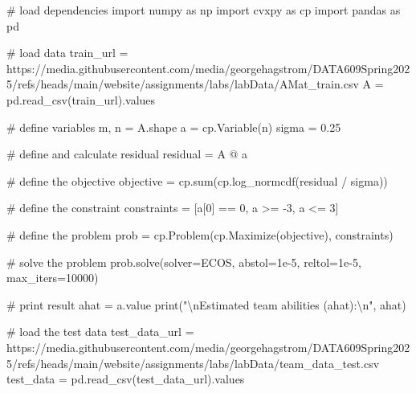 \documentclass[
  letterpaper,
  DIV=11,
  numbers=noendperiod]{scrartcl}
\newenvironment{Shaded}{\begin{snugshade}}{\end{snugshade}}
\newcommand{\BuiltInTok}[1]{\textcolor[rgb]{0.00,0.23,0.31}{#1}}
\newcommand{\CharTok}[1]{\textcolor[rgb]{0.13,0.47,0.30}{#1}}
\newcommand{\CommentTok}[1]{\textcolor[rgb]{0.37,0.37,0.37}{#1}}
\newcommand{\DecValTok}[1]{\textcolor[rgb]{0.68,0.00,0.00}{#1}}
\newcommand{\FloatTok}[1]{\textcolor[rgb]{0.68,0.00,0.00}{#1}}
\newcommand{\ImportTok}[1]{\textcolor[rgb]{0.00,0.46,0.62}{#1}}
\newcommand{\NormalTok}[1]{\textcolor[rgb]{0.00,0.23,0.31}{#1}}
\newcommand{\OperatorTok}[1]{\textcolor[rgb]{0.37,0.37,0.37}{#1}}
\newcommand{\StringTok}[1]{\textcolor[rgb]{0.13,0.47,0.30}{#1}}
\begin{document}
\begin{Shaded}
\begin{Highlighting}[]
\CommentTok{\# load dependencies}
\ImportTok{import}\NormalTok{ numpy }\ImportTok{as}\NormalTok{ np}
\ImportTok{import}\NormalTok{ cvxpy }\ImportTok{as}\NormalTok{ cp}
\ImportTok{import}\NormalTok{ pandas }\ImportTok{as}\NormalTok{ pd}

\CommentTok{\# load data}
\NormalTok{train\_url }\OperatorTok{=} \StringTok{\textquotesingle{}https://media.githubusercontent.com/media/georgehagstrom/DATA609Spring2025/refs/heads/main/website/assignments/labs/labData/AMat\_train.csv\textquotesingle{}}
\NormalTok{A }\OperatorTok{=}\NormalTok{ pd.read\_csv(train\_url).values}

\CommentTok{\# define variables}
\NormalTok{m, n }\OperatorTok{=}\NormalTok{ A.shape}
\NormalTok{a }\OperatorTok{=}\NormalTok{ cp.Variable(n)}
\NormalTok{sigma }\OperatorTok{=} \FloatTok{0.25}

\CommentTok{\# define and calculate residual}
\NormalTok{residual }\OperatorTok{=}\NormalTok{ A }\OperatorTok{@}\NormalTok{ a}

\CommentTok{\# define the objective}
\NormalTok{objective }\OperatorTok{=}\NormalTok{ cp.}\BuiltInTok{sum}\NormalTok{(cp.log\_normcdf(residual }\OperatorTok{/}\NormalTok{ sigma))}

\CommentTok{\# define the constraint}
\NormalTok{constraints }\OperatorTok{=}\NormalTok{ [a[}\DecValTok{0}\NormalTok{] }\OperatorTok{==} \DecValTok{0}\NormalTok{, a }\OperatorTok{\textgreater{}=} \OperatorTok{{-}}\DecValTok{3}\NormalTok{, a }\OperatorTok{\textless{}=} \DecValTok{3}\NormalTok{]}

\CommentTok{\# define the problem}
\NormalTok{prob }\OperatorTok{=}\NormalTok{ cp.Problem(cp.Maximize(objective), constraints)}

\CommentTok{\# solve the problem}
\NormalTok{prob.solve(solver}\OperatorTok{=}\StringTok{\textquotesingle{}ECOS\textquotesingle{}}\NormalTok{, abstol}\OperatorTok{=}\FloatTok{1e{-}5}\NormalTok{, reltol}\OperatorTok{=}\FloatTok{1e{-}5}\NormalTok{, max\_iters}\OperatorTok{=}\DecValTok{10000}\NormalTok{)}

\CommentTok{\# print result}
\NormalTok{ahat }\OperatorTok{=}\NormalTok{ a.value}
\BuiltInTok{print}\NormalTok{(}\StringTok{"}\CharTok{\textbackslash{}n}\StringTok{Estimated team abilities (ahat):}\CharTok{\textbackslash{}n}\StringTok{"}\NormalTok{, ahat)}

\CommentTok{\# load the test data}
\NormalTok{test\_data\_url }\OperatorTok{=} \StringTok{\textquotesingle{}https://media.githubusercontent.com/media/georgehagstrom/DATA609Spring2025/refs/heads/main/website/assignments/labs/labData/team\_data\_test.csv\textquotesingle{}}
\NormalTok{test\_data }\OperatorTok{=}\NormalTok{ pd.read\_csv(test\_data\_url).values}


\end{Highlighting}
\end{Shaded}
\end{document}
